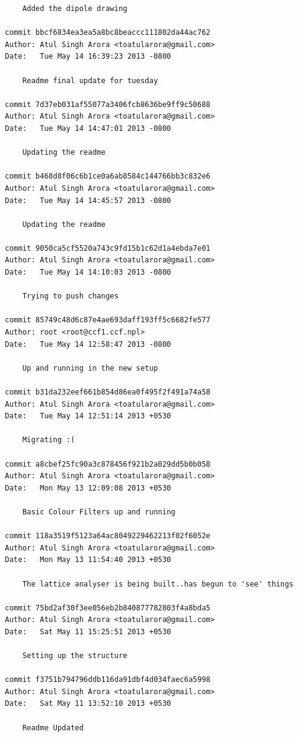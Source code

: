 \begin{lstlisting}
    Added the dipole drawing

commit bbcf6834ea3ea5a8bc8beaccc111802da44ac762
Author: Atul Singh Arora <toatularora@gmail.com>
Date:   Tue May 14 16:39:23 2013 -0800

    Readme final update for tuesday

commit 7d37eb031af55077a3406fcb8636be9ff9c50688
Author: Atul Singh Arora <toatularora@gmail.com>
Date:   Tue May 14 14:47:01 2013 -0800

    Updating the readme

commit b468d8f06c6b1ce0a6ab8584c144766bb3c832e6
Author: Atul Singh Arora <toatularora@gmail.com>
Date:   Tue May 14 14:45:57 2013 -0800

    Updating the readme

commit 9050ca5cf5520a743c9fd15b1c62d1a4ebda7e01
Author: Atul Singh Arora <toatularora@gmail.com>
Date:   Tue May 14 14:10:03 2013 -0800

    Trying to push changes

commit 85749c48d6c87e4ae693daff193ff5c6682fe577
Author: root <root@ccf1.ccf.npl>
Date:   Tue May 14 12:58:47 2013 -0800

    Up and running in the new setup

commit b31da232eef661b854d86ea0f495f2f491a74a58
Author: Atul Singh Arora <toatularora@gmail.com>
Date:   Tue May 14 12:51:14 2013 +0530

    Migrating :(

commit a8cbef25fc90a3c878456f921b2a029dd5b0b058
Author: Atul Singh Arora <toatularora@gmail.com>
Date:   Mon May 13 12:09:08 2013 +0530

    Basic Colour Filters up and running

commit 118a3519f5123a64ac8049229462213f02f6052e
Author: Atul Singh Arora <toatularora@gmail.com>
Date:   Mon May 13 11:54:40 2013 +0530

    The lattice analyser is being built..has begun to 'see' things

commit 75bd2af30f3ee056eb2b840877782803f4a8bda5
Author: Atul Singh Arora <toatularora@gmail.com>
Date:   Sat May 11 15:25:51 2013 +0530

    Setting up the structure

commit f3751b794796ddb116da91dbf4d034faec6a5998
Author: Atul Singh Arora <toatularora@gmail.com>
Date:   Sat May 11 13:52:10 2013 +0530

    Readme Updated		
		\end{lstlisting}	